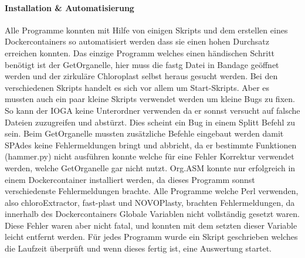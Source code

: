 \documentclass{scrartcl}
\begin{document}
\paragraph{Installation \& Automatisierung}
\label{sec-3-1-2-1}
Alle Programme konnten mit Hilfe von einigen Skripts und dem erstellen eines Dockercontainers so 
automatisiert werden dass sie einen hohen Durchsatz erreichen konnten. Das einzige Programm welches
einen händischen Schritt benötigt ist der GetOrganelle, hier muss die fastg Datei in Bandage
geöffnet werden und der zirkuläre Chloroplast selbst heraus gesucht werden.
Bei den verschiedenen Skripts handelt es sich vor allem um Start-Skripts. Aber es mussten auch ein paar 
kleine Skripts verwendet werden um kleine Bugs zu fixen. So kann der IOGA keine Unterordner verwenden da er sonnst
versucht auf falsche Dateien zuzugreifen und abstürzt. Dies scheint ein Bug in einem Splitt Befehl zu sein. Beim GetOrganelle mussten
zusätzliche Befehle eingebaut werden damit SPAdes keine Fehlermeldungen bringt und abbricht, da er bestimmte Funktionen (hammer.py) nicht ausführen konnte
welche für eine Fehler Korrektur verwendet werden, welche GetOrganelle gar nicht nutzt. Org.ASM konnte nur erfolgreich in einem Dockercontainer
installiert werden, da dieses Programm sonnst verschiedenste Fehlermeldungen brachte. Alle Programme welche Perl verwenden, also
chloroExtractor, fast-plast und NOVOPlasty, brachten Fehlermeldungen, da innerhalb des Dockercontainers Globale Variablen nicht vollständig gesetzt waren. 
Diese Fehler waren aber nicht fatal, und konnten mit dem setzten dieser Variable leicht entfernt werden. 
Für jedes Programm wurde ein Skript geschrieben welches die Laufzeit überprüft und wenn dieses fertig ist, eine Auswertung startet.
\end{document}
